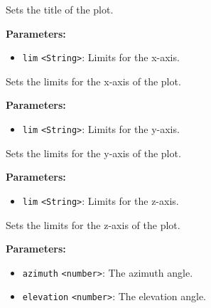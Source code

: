 \documentclass[12pt,a4paper]{article}
\begin{document}
\noindent Sets the title of the plot.

\vspace{5mm}
\noindent {}


\noindent \textbf{Parameters:}
\begin{itemize}
  \item \texttt{lim} \texttt{<String>}: Limits for the x-axis.
\end{itemize}

\noindent Sets the limits for the x-axis of the plot.

\vspace{5mm}
\noindent {}


\noindent \textbf{Parameters:}
\begin{itemize}
  \item \texttt{lim} \texttt{<String>}: Limits for the y-axis.
\end{itemize}

\noindent Sets the limits for the y-axis of the plot.

\vspace{5mm}
\noindent {}


\noindent \textbf{Parameters:}
\begin{itemize}
  \item \texttt{lim} \texttt{<String>}: Limits for the z-axis.
\end{itemize}

\noindent Sets the limits for the z-axis of the plot.

\vspace{5mm}
\noindent {}


\noindent \textbf{Parameters:}
\begin{itemize}
  \item \texttt{azimuth} \texttt{<number>}: The azimuth angle.
  \item \texttt{elevation} \texttt{<number>}: The elevation angle.
\end{itemize}
\end{document}
